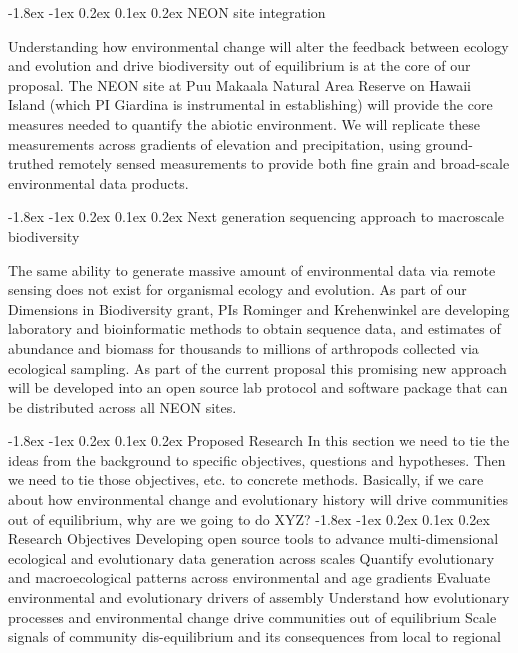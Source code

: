 \documentclass[11pt]{article}
\makeatletter
\renewcommand\section{\@startsection{section}{1}{\z@}%
                                  {-1.8ex \@plus -1ex \@minus 0.2ex}%
                                  {0.1ex \@plus 0.2ex}%
                                  {\normalfont\Large\bfseries}}
\renewcommand\subsection{\@startsection{subsection}{1}{\z@}%
                                  {-1.8ex \@plus -1ex \@minus 0.2ex}%
                                  {0.1ex \@plus 0.2ex}%
                                  {\normalfont\large\bfseries}}
\makeatother
\begin{document}
\subsection{NEON site integration}

Understanding how environmental change will alter the feedback between ecology and evolution and drive biodiversity out of equilibrium is at the core of our proposal. The NEON site at Puu Makaala Natural Area Reserve on Hawaii Island (which PI Giardina is instrumental in establishing) will provide the core measures needed to quantify the abiotic environment.  We will replicate these measurements across gradients of elevation and precipitation, using ground-truthed remotely sensed measurements to provide both fine grain and broad-scale environmental data products.


\subsection{Next generation sequencing approach to macroscale biodiversity}

The same ability to generate massive amount of environmental data via remote sensing does not exist for organismal ecology and evolution.  As part of our Dimensions in Biodiversity grant, PIs Rominger and Krehenwinkel are developing laboratory and bioinformatic methods to obtain sequence data, and estimates of abundance and biomass for thousands to millions of arthropods collected via ecological sampling.  As part of the current proposal this promising new approach will be developed into an open source lab protocol and software package that can be distributed across all NEON sites.


\section{Proposed Research}
In this section we need to tie the ideas from the background to specific objectives, questions and hypotheses.  Then we need to tie those objectives, etc. to concrete methods.  Basically, if we care about how environmental change and evolutionary history will drive communities out of equilibrium, why are we going to do XYZ?
\subsection{Research Objectives}
Developing open source tools to advance multi-dimensional ecological and evolutionary data generation across scales
Quantify evolutionary and macroecological patterns across environmental and age gradients
Evaluate environmental and evolutionary drivers of assembly
Understand how evolutionary processes and environmental change drive communities out of equilibrium
Scale signals of community dis-equilibrium and its consequences from local to regional
\end{document}
